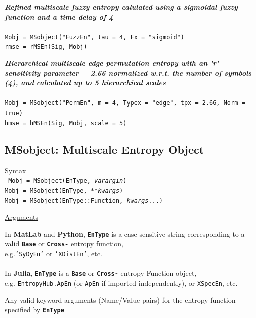 \documentclass[12pt, a4paper, titlepage, openany]{book}
\begin{document}
\noindent \emph{\textbf{Refined multiscale fuzzy entropy calulated using a sigmoidal fuzzy function and a time delay of 4}}
\\ \ \\ \indent \texttt{Mobj = MSobject("FuzzEn", tau = 4, Fx = "sigmoid")\\
\indent rmse = rMSEn(Sig, Mobj)}

\noindent \emph{\textbf{Hierarchical multiscale edge permutation entropy with an 'r' sensitivity parameter = 2.66 normalized w.r.t. the number of symbols (4), and calculated up to 5 hierarchical scales}}
\\ \ \\ \indent \texttt{Mobj = MSobject("PermEn", m = 4, Typex = "edge", tpx = 2.66, Norm = true)\\
\indent hmse = hMSEn(Sig, Mobj, scale = 5)}
\normalsize



\newpage
\subsection{\normalsize MSobject: \hspace{15mm} Multiscale Entropy Object}
\noindent\ul{Syntax} \vspace{6mm} \\ \noindent \texttt{\footnotesize
Mobj = MSobject(EnType, \textit{varargin})\\
Mobj = MSobject(EnType, \textit{**kwargs})\\ 
Mobj = MSobject(EnType::Function, \textit{kwargs}...)}

\noindent \ul{Arguments}
\begin{description}[labelsep=2cm, labelwidth=5cm, nosep, style=multiline,leftmargin=4cm]\footnotesize
\item[\texttt{EnType}]		In \textbf{MatLab} and \textbf{Python}, \texttt{\textbf{EnType}} is a case-sensitive 							string corresponding to a valid \texttt{\textbf{Base}} or  \texttt{\textbf{Cross-}} entropy 							function, \\	e.g.\texttt{'SyDyEn'} or \texttt{'XDistEn'}, etc.\\ \ \\
							In \textbf{Julia}, \texttt{\textbf{EnType}} is a \texttt{\textbf{Base}} or  									\texttt{\textbf{Cross-}} entropy Function object,\\ e.g. \texttt{EntropyHub.ApEn} (or 									\texttt{ApEn} if imported independently), or \texttt{XSpecEn}, etc.\\
\item[\texttt{varargin\\ **kwargs\\kwargs...}] 		Any valid keyword arguments (Name/Value pairs) for the entropy function specified by \texttt{\textbf{EnType}}\\
\end{description}
\end{document}
